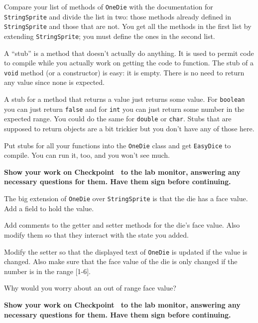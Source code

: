 \documentclass[12pt,twoside]{memoir}
\newcommand\code[1]{\lstinline^#1^}
\newenvironment{Checkpoint}[1]{%
\begin{Exercise}[name={Checkpoint},title={#1}]}{%
\end{Exercise}%
\textbf{Show your work on Checkpoint~\theExercise{} to the lab monitor, %
  answering any necessary questions for them.  Have them sign before continuing.}}
\begin{document}
\begin{Checkpoint}{Implement Stubs}
  Compare your list of methods of \code{OneDie} with the documentation
  for \code{StringSprite} and divide the list in two: those methods
  already defined in \code{StringSprite} and those that are not. You
  get all the methods in the first list by extending
  \code{StringSprite}; you must define the ones in the second list.

  A ``stub'' is a method that doesn't actually do anything. It is used
  to permit code to compile while you actually work on getting the
  code to function. The stub of a \code{void} method (or a
  constructor) is easy: it is empty. There is no need to return any
  value since none is expected.

  A stub for a method that returns a value just returns some
  value. For \code{boolean} you can just return \code{false} and for
  \code{int} you can just return some number in the expected
  range. You could do the same for \code{double} or \code{char}. Stubs
  that are supposed to return objects are a bit trickier but you don't
  have any of those here.

  Put stubs for all your functions into the \code{OneDie} class and
  get \code{EasyDice} to compile. You can run it, too, and you won't
  see much.
\end{Checkpoint}

\begin{Checkpoint}{Add State}
  The big extension of \code{OneDie} over \code{StringSprite} is that
  the die has a face value. Add a field to hold the value.

  Add comments to the getter and setter methods for the die's face
  value. Also modify them so that they interact with the state you
  added. 

  Modify the setter so that the displayed text of \code{OneDie} is
  updated if the value is changed. Also make sure that the face value
  of the die is only changed if the number is in the range [1-6].

  Why would you worry about an out of range face value? 
\end{Checkpoint}
\end{document}
